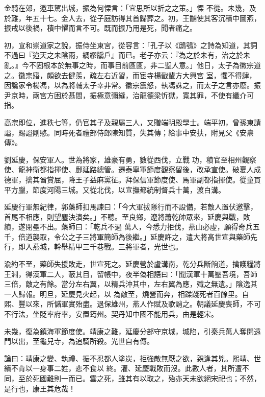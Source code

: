 \begin{pinyinscope}
 金騎在郊，邀車駕出城，振為何慄言：「宜思所以折之之策。」慄
 不從。未幾，及於難，年五十七。金人去，從子庭訪得其首歸葬之。初，王黼使其客沉積中圖燕，振戒以後禍，積中懼而言不可。既而振乃用是死，聞者痛之。



 初，宣和崇道家之說，振侍坐東宮，從容言：「孔子以《鴟鴞》之詩為知道，其詞不過曰『迨天之未陰雨，綢繆牖戶』而已。老子亦云：『為之於未有，治之於未亂。』今不固根本於無事之時，而事目前區區，非二聖人意。」他日，太子為徽宗道之。徽宗寤，頗欲去健羨，疏左右近習，而宦寺楊戩輩方大興宮
 室，懼不得肆，因讒家令楊馮，以為將輔太子幸非常。徽宗震怒，執馮誅之，而太子之言亦廢。振尹京時，兩宮方困於惎間，振極意彌縫，治龍德梁忻獄，寬其罪，不使有纖介可指。



 高宗即位，進秩七等，仍官其子及親屬三人，又贈端明殿學士。端平初，曾孫東請謚，賜謚剛愍。同時死者禮部侍郎陳知質，失其傳；給事中安扶，附見父《安燾傳》。



 劉延慶，保安軍人。世為將家，雄豪有勇，數從西伐，立戰
 功，積官至相州觀察使、龍神衛都指揮使、鄜延路總管。遷泰寧軍節度觀察留後，改承宣使。破夏人成德軍，擒其酋賞屈，降王子益麻黨征。拜保信軍節度使、馬軍副都指揮使。從童貫平方臘，節度河陽三城。又從北伐，以宣撫都統制督兵十萬，渡白溝。



 延慶行軍無紀律，郭藥師扣馬諫曰：「今大軍拔隊行而不設備，若敵人置伏邀擊，首尾不相應，則望塵決潰矣。」不聽。至良鄉，遼將蕭乾帥眾來，延慶與戰，敗績，遂閉壘不出。藥師曰：「乾兵不過
 萬人，今悉力拒伐，燕山必虛，願得奇兵五千，倍道襲取，令公之子三將軍簡師為後繼。」延慶許之，遣大將高世宣與藥師先行，即入燕城，幹舉精甲三千巷戰。三將軍者，光世也。



 渝約不至，藥師失援敗走，世宣死之。延慶營於盧溝南，乾分兵斷餉道，擒護糧將王淵，得漢軍二人，蔽其目，留帳中，夜半偽相語曰：「聞漢軍十萬壓吾境，吾師三倍，敵之有餘。當分左右翼，以精兵沖其中，左右翼為應，殲之無遺。」陰逸其一人歸報。明旦，延慶見火起，以
 為敵至，燒營而奔，相蹂踐死者百餘里。自熙、豐以來，所儲軍實殆盡。退保雄州，燕人作賦及歌誚之。朝議延慶喪師，不可不行法，坐貶率府率，安置筠州。契丹知中國不能用兵，由是輕宋。



 未幾，復為鎮海軍節度使。靖康之難，延慶分部守京城，城陷，引秦兵萬人奪開遠門以出，至龜兒寺，為追騎所殺。光世自有傳。



 論曰：靖康之變、執禮、振不忍都人塗炭，拒強敵無厭之欲，親逢其兇。熙靖、世績不肯以一身事二姓，悲不食以
 終。灌、延慶戰敗而沒。此數人者，其所遭不同，至於死國難則一而已。雲之死，雖其有以取之，殆亦天未欲絕宋祀也；不然，是行也，康王其危哉！



\end{pinyinscope}